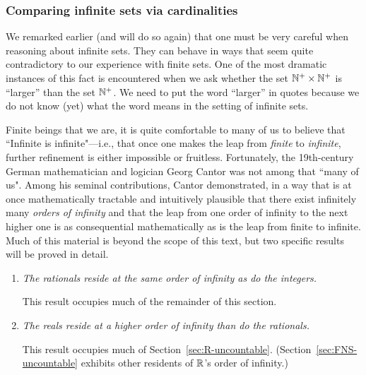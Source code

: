 \subsubsection{Comparing infinite sets via cardinalities}
\label{sec:compare-sets-via-card}

We remarked earlier (and will do so again) that one must be very careful when reasoning about infinite sets.  They can behave in ways that seem quite contradictory to our experience with finite sets.  One of the most dramatic instances of this fact is encountered when we ask whether the set $\mathbb{N}^+ \times \mathbb{N}^+$ is ``larger'' than the set $\mathbb{N}^+$.  We need to put the word ``larger'' in quotes because we do not know (yet) what the word means in the setting of infinite sets.

\smallskip

  
Finite beings that we are, it is quite comfortable to many of us to believe that ``Infinite is infinite"---i.e., that once one makes the leap from {\em finite} to {\em infinite}, further refinement is either impossible or fruitless.  Fortunately, the 19th-century German mathematician and logician Georg Cantor was not among that ``many of us".  Among his seminal contributions, Cantor demonstrated, in a way that is at once mathematically tractable and intuitively plausible that there exist infinitely many {\em orders of infinity} and that the leap from one order of infinity to the next higher one is as consequential mathematically as is the leap from finite to infinite.  Much of this material is beyond the scope of this text, but two specific results will be proved in detail.
\begin{enumerate}
\item
{\em The rationals reside at the same order of infinity as do the integers.}

\smallskip

This result occupies much of the remainder of this section.
\item
{\em The reals reside at a higher order of infinity than do the rationals.}

\smallskip

This result occupies much of Section~\ref{sec:R-uncountable}.  (Section~\ref{sec:FNS-uncountable} exhibits other residents of $\mathbb{R}$'s order of infinity.)
\end{enumerate}

\medskip

